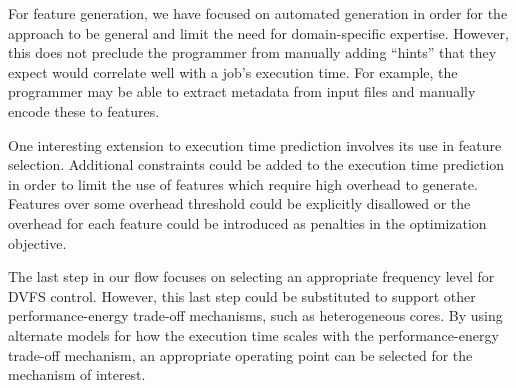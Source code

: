 For feature generation, we have focused on automated generation in order for
the approach to be general and limit the need for domain-specific expertise.
However, this does not preclude the programmer from manually adding ``hints''
that they expect would correlate well with a job's execution time. For example,
the programmer may be able to extract metadata from input files and manually
encode these to features.

One interesting extension to execution time prediction involves its use in
feature selection. Additional constraints could be added to the execution time
prediction in order to limit the use of features which require high overhead to
generate. Features over some overhead threshold could be explicitly disallowed
or the overhead for each feature could be introduced as penalties in the
optimization objective.

The last step in our flow focuses on selecting an appropriate frequency level
for DVFS control. However, this last step could be substituted to support other
performance-energy trade-off mechanisms, such as heterogeneous cores. By using
alternate models for how the execution time scales with the performance-energy
trade-off mechanism, an appropriate operating point can be selected for the
mechanism of interest.
